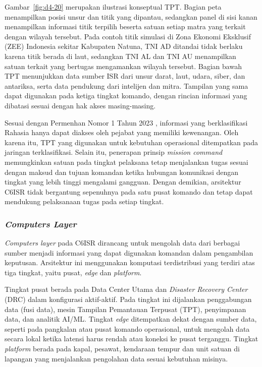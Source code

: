 Gambar~\ref{fig:d4-20} merupakan ilustrasi konseptual TPT. Bagian peta menampilkan posisi unsur dan titik yang dipantau, sedangkan panel di sisi kanan menampilkan informasi titik terpilih beserta satuan setiap matra yang terkait dengan wilayah tersebut. Pada contoh titik simulasi di Zona Ekonomi Eksklusif (ZEE) Indonesia sekitar Kabupaten Natuna, TNI AD ditandai tidak berlaku karena titik berada di laut, sedangkan TNI AL dan TNI AU menampilkan satuan terkait yang bertugas mengamankan wilayah tersebut. Bagian bawah TPT menunjukkan data sumber ISR dari unsur darat, laut, udara, siber, dan antariksa, serta data pendukung dari intelijen dan mitra. Tampilan yang sama dapat digunakan pada ketiga tingkat komando, dengan rincian informasi yang dibatasi sesuai dengan hak akses masing-masing.

Sesuai dengan Permenhan Nomor 1 Tahun 2023 \parencite{Permenhan1Tahun2023}, informasi yang berklasifikasi Rahasia hanya dapat diakses oleh pejabat yang memiliki kewenangan. Oleh karena itu, TPT yang digunakan untuk kebutuhan operasional ditempatkan pada jaringan terklasifikasi. Selain itu, penerapan prinsip \textit{mission command} memungkinkan satuan pada tingkat pelaksana tetap menjalankan tugas sesuai dengan maksud dan tujuan komandan ketika hubungan komunikasi dengan tingkat yang lebih tinggi mengalami gangguan. Dengan demikian, arsitektur C6ISR tidak bergantung sepenuhnya pada satu pusat komando dan tetap dapat mendukung pelaksanaan tugas pada setiap tingkat.

\subsubsection{\textit{Computers Layer}}

\textit{Computers layer} pada C6ISR dirancang untuk mengolah data dari berbagai sumber menjadi informasi yang dapat digunakan komandan dalam pengambilan keputusan. Arsitektur ini menggunakan komputasi terdistribusi yang terdiri atas tiga tingkat, yaitu pusat, \textit{edge} dan \textit{platform}.

Tingkat pusat berada pada Data Center Utama dan \textit{Disaster Recovery Center} (DRC) dalam konfigurasi aktif-aktif. Pada tingkat ini dijalankan penggabungan data (fusi data), mesin Tampilan Pemantauan Terpusat (TPT), penyimpanan data, dan analitik AI/ML. Tingkat \textit{edge} ditempatkan dekat dengan sumber data, seperti pada pangkalan atau pusat komando operasional, untuk mengolah data secara lokal ketika latensi harus rendah atau koneksi ke pusat terganggu. Tingkat \textit{platform} berada pada kapal, pesawat, kendaraan tempur dan unit satuan di lapangan yang menjalankan pengolahan data sesuai kebutuhan misinya.

